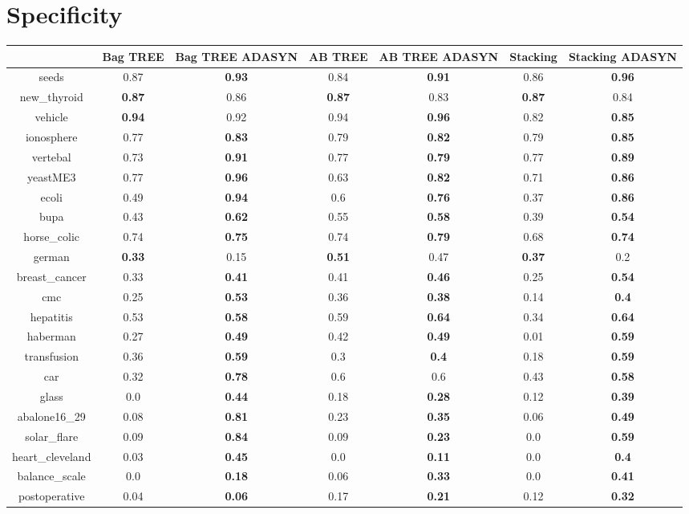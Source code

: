 \documentclass{article}%
\begin{document}
%
\section*{Specificity}%
\begin{tabular}{c|cccccc}%
&Bag TREE&Bag TREE ADASYN&AB TREE&AB TREE ADASYN&Stacking&Stacking ADASYN\\%
\hline%
seeds&0.87&\textbf{0.93}&0.84&\textbf{0.91}&0.86&\textbf{0.96}\\%
new\_thyroid&\textbf{0.87}&0.86&\textbf{0.87}&0.83&\textbf{0.87}&0.84\\%
vehicle&\textbf{0.94}&0.92&0.94&\textbf{0.96}&0.82&\textbf{0.85}\\%
ionosphere&0.77&\textbf{0.83}&0.79&\textbf{0.82}&0.79&\textbf{0.85}\\%
vertebal&0.73&\textbf{0.91}&0.77&\textbf{0.79}&0.77&\textbf{0.89}\\%
yeastME3&0.77&\textbf{0.96}&0.63&\textbf{0.82}&0.71&\textbf{0.86}\\%
ecoli&0.49&\textbf{0.94}&0.6&\textbf{0.76}&0.37&\textbf{0.86}\\%
bupa&0.43&\textbf{0.62}&0.55&\textbf{0.58}&0.39&\textbf{0.54}\\%
horse\_colic&0.74&\textbf{0.75}&0.74&\textbf{0.79}&0.68&\textbf{0.74}\\%
german&\textbf{0.33}&0.15&\textbf{0.51}&0.47&\textbf{0.37}&0.2\\%
breast\_cancer&0.33&\textbf{0.41}&0.41&\textbf{0.46}&0.25&\textbf{0.54}\\%
cmc&0.25&\textbf{0.53}&0.36&\textbf{0.38}&0.14&\textbf{0.4}\\%
hepatitis&0.53&\textbf{0.58}&0.59&\textbf{0.64}&0.34&\textbf{0.64}\\%
haberman&0.27&\textbf{0.49}&0.42&\textbf{0.49}&0.01&\textbf{0.59}\\%
transfusion&0.36&\textbf{0.59}&0.3&\textbf{0.4}&0.18&\textbf{0.59}\\%
car&0.32&\textbf{0.78}&0.6&0.6&0.43&\textbf{0.58}\\%
glass&0.0&\textbf{0.44}&0.18&\textbf{0.28}&0.12&\textbf{0.39}\\%
abalone16\_29&0.08&\textbf{0.81}&0.23&\textbf{0.35}&0.06&\textbf{0.49}\\%
solar\_flare&0.09&\textbf{0.84}&0.09&\textbf{0.23}&0.0&\textbf{0.59}\\%
heart\_cleveland&0.03&\textbf{0.45}&0.0&\textbf{0.11}&0.0&\textbf{0.4}\\%
balance\_scale&0.0&\textbf{0.18}&0.06&\textbf{0.33}&0.0&\textbf{0.41}\\%
postoperative&0.04&\textbf{0.06}&0.17&\textbf{0.21}&0.12&\textbf{0.32}\\%
\end{tabular}
\end{document}
